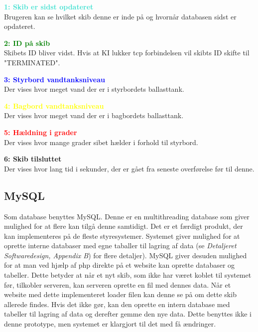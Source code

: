 \textcolor{Turquoise}{\textbf{1: Skib er sidst opdateret}}\\
Brugeren kan se hvilket skib denne er inde på og hvornår databasen sidst er opdateret.

\textcolor{green}{\textbf{2: ID på skib}}\\
Skibets ID bliver vidst. Hvis at KI lukker tcp forbindelsen vil skibts ID skifte til "TERMINATED".

\textcolor{blue}{\textbf{3: Styrbord vandtanksniveau}}\\
Der vises hvor meget vand der er i styrbordets ballasttank.

\textcolor{yellow}{\textbf{4: Bagbord vandtanksniveau}}\\
Der vises hvor meget vand der er i bagbordets ballasttank.

\textcolor{red}{\textbf{5: Hældning i grader}}\\
Der vises hvor mange grader sibet hælder i forhold til styrbord.

\textcolor{RoyalPurple}{\textbf{6: Skib tilsluttet}}\\
Der vises hvor lang tid i sekunder, der er gået fra seneste overførelse før til denne.


\subsection{MySQL}
Som database benyttes MySQL. Denne er en multithreading database som giver mulighed for at flere kan tilgå denne samtidigt. Det er et færdigt produkt, der kan implementeres på de fleste styresystemer. Systemet giver mulighed for at oprette interne databaser med egne taballer til lagring af data (se \textit{Detaljeret Softwaredesign, Appendix B}) for flere detaljer).
MySQL giver desuden mulighed for at man ved hjælp af php direkte på et website kan oprette databaser og tabeller. Dette betyder at når et nyt skib, som ikke har været koblet til systemet før, tilkobler serveren, kan serveren oprette en fil med dennes data. Når et website med dette implementeret loader filen kan denne se på om dette skib allerede findes. Hvis det ikke gør, kan den oprette en intern database med tabeller til lagring af data og derefter gemme den nye data. Dette benyttes ikke i denne prototype, men systemet er klargjort til det med få ændringer.